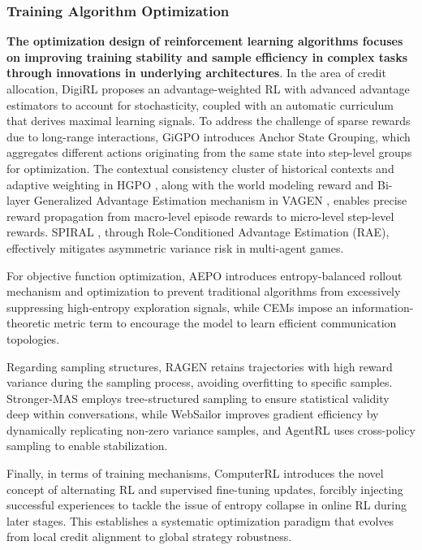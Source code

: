 \subsubsection{Training Algorithm Optimization}
\label{sec:algorithmic_optimization}
\textbf{The optimization design of reinforcement learning algorithms focuses on improving training stability and sample efficiency in complex tasks through innovations in underlying architectures}.
In the area of credit allocation, DigiRL \cite{DigiRL} proposes an advantage-weighted RL with advanced advantage estimators to account for stochasticity, coupled with an automatic curriculum that derives maximal learning signals. To address the challenge of sparse rewards due to long-range interactions, GiGPO \cite{GiGPO} introduces Anchor State Grouping, which aggregates different actions originating from the same state into step-level groups for optimization. The contextual consistency cluster of historical contexts and adaptive weighting in HGPO \cite{HGPO}, along with the world modeling reward and Bi-layer Generalized Advantage Estimation mechanism in VAGEN \cite{VAGEN}, enables precise reward propagation from macro-level episode rewards to micro-level step-level rewards. SPIRAL \cite{SPIRAL}, through Role-Conditioned Advantage Estimation (RAE), effectively mitigates asymmetric variance risk in multi-agent games.


For objective function optimization, AEPO \cite{AEPO} introduces entropy-balanced rollout mechanism and optimization to prevent traditional algorithms from excessively suppressing high-entropy exploration signals, while CEMs \cite{CEMs} impose an information-theoretic metric term to encourage the model to learn efficient communication topologies.

Regarding sampling structures, RAGEN \cite{RAGEN} retains trajectories with high reward variance during the sampling process, avoiding overfitting to specific samples. Stronger-MAS \cite{STRONGER-MAS} employs tree-structured sampling to ensure statistical validity deep within conversations, while WebSailor \cite{WebSailor} improves gradient efficiency by dynamically replicating non-zero variance samples, and AgentRL \cite{AgentRL} uses cross-policy sampling to enable stabilization. 

Finally, in terms of training mechanisms, ComputerRL \cite{ComputerRL} introduces the novel concept of alternating RL and supervised fine-tuning updates, forcibly injecting successful experiences to tackle the issue of entropy collapse in online RL during later stages. This establishes a systematic optimization paradigm that evolves from local credit alignment to global strategy robustness.


